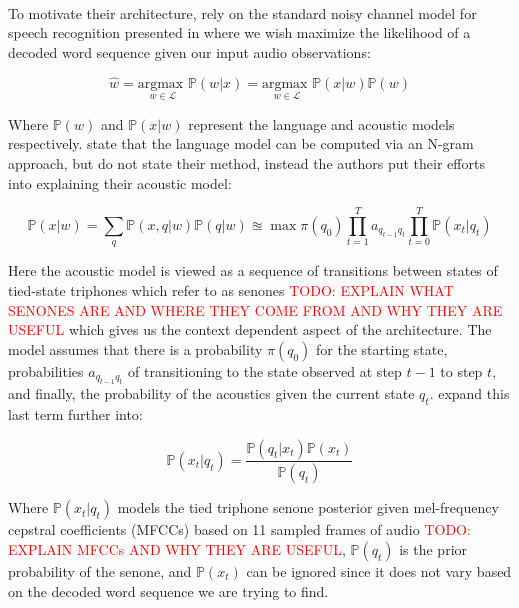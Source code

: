 \documentclass[letterpaper]{article}
\newcommand{\TODO}[1]{\textcolor{red}{TODO: #1}}
\newcommand{\argmax}[1]{\underset{#1}{\text{argmax }}}
\newcommand{\cprob}[2]{ \prob{#1 \lvert #2} }
\newcommand{\prob}[1]{\mathbb{P}\left( #1 \right)}
\begin{document}
\paragraph{} To motivate their architecture, \cite{DBLP:journals/taslp/DahlYDA12} rely on the standard noisy channel model for speech recognition presented in \cite{jurafskyMartin} where we wish maximize the likelihood of a decoded word sequence given our input audio observations:

\begin{equation}
\hat{w} = \argmax{w \in \mathscr{L}} \cprob{w}{x} = \argmax{w \in \mathscr{L}} \cprob{x}{w} \prob{w} 
\label{eqn:asr:def}
\end{equation}

Where $\prob{w}$ and $\cprob{x}{w}$ represent the language and acoustic models respectively. \cite{jurafskyMartin} state that the language model can be computed via an N-gram approach, but \cite{DBLP:journals/taslp/DahlYDA12} do not state their method, instead the authors put their efforts into explaining their acoustic model:

\begin{equation}
\cprob{x}{w} = \sum_{q} \cprob{x,q}{w} \cprob{q}{w} \approxeq \max \pi(q_0) \prod_{t = 1}^T a_{q_{t-1} q_t} \prod_{t=0}^T \cprob{x_t}{q_t} 
\label{eqn:lm:def}
\end{equation}

Here the acoustic model is viewed as a sequence of transitions between states of tied-state triphones which \cite{DBLP:journals/taslp/DahlYDA12} refer to as senones \TODO{EXPLAIN WHAT SENONES ARE AND WHERE THEY COME FROM AND WHY THEY ARE USEFUL} which gives us the context dependent aspect of the architecture. The model assumes that there is a probability $\pi(q_0)$ for the starting state, probabilities $a_{q_{t-1} q_{t}}$ of transitioning to the state observed at step $t -1$ to step $t$, and finally, the probability of the acoustics given the current state $q_t$. \cite{DBLP:journals/taslp/DahlYDA12} expand this last term further into:

\begin{equation*}
	\cprob{x_t}{q_t} = \frac{\cprob{q_t}{x_t} \prob{x_t}}{\prob{q_t}}
	\label{eqn:senone:def}	
\end{equation*}

Where $\cprob{x_t}{q_t}$ models the tied triphone senone posterior given mel-frequency cepstral coefficients (MFCCs) based on 11 sampled frames of audio \TODO{EXPLAIN MFCCs AND WHY THEY ARE USEFUL}, $\prob{q_t}$ is the prior probability of the senone, and $\prob{x_t}$ can be ignored since it does not vary based on the decoded word sequence we are trying to find.
\end{document}
